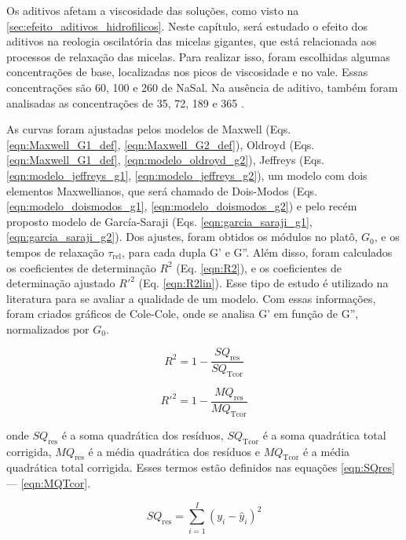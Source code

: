 		Os aditivos afetam a viscosidade das soluções, como visto na \autoref{sec:efeito_aditivos_hidrofilicos}. Neste capítulo, será estudado o efeito dos aditivos na reologia oscilatória das micelas gigantes, que está relacionada aos processos de relaxação das micelas. Para realizar isso, foram escolhidas algumas concentrações de base, localizadas nos picos de viscosidade e no vale. Essas concentrações são 60, 100 e 260\mM{} de NaSal. Na ausência de aditivo, também foram analisadas as concentrações de 35, 72, 189 e 365 \mM.
		
		As curvas foram ajustadas pelos modelos de Maxwell (Eqs. \ref{eqn:Maxwell_G1_def}, \ref{eqn:Maxwell_G2_def}), Oldroyd (Eqs. \ref{eqn:Maxwell_G1_def}, \ref{eqn:modelo_oldroyd_g2}), Jeffreys (Eqs. \ref{eqn:modelo_jeffreys_g1}, \ref{eqn:modelo_jeffreys_g2}), um modelo com dois elementos Maxwellianos, que será chamado de Dois-Modos (Eqs. \ref{eqn:modelo_doismodos_g1}, \ref{eqn:modelo_doismodos_g2}) e pelo recém proposto modelo de García-Saraji (Eqs. \ref{eqn:garcia_saraji_g1}, \ref{eqn:garcia_saraji_g2}). Dos ajustes, foram obtidos os módulos no platô, \(G_0\), e os tempos de relaxação \(\tau_\mathrm{rel}\), para cada dupla G' e G''. Além disso, foram calculados os coeficientes de determinação \(R^2\) (Eq. \ref{eqn:R2}), e os coeficientes de determinação ajustado \(R\mathrm{'}^{2}\) (Eq. \ref{eqn:R2lin}). Esse tipo de estudo é utilizado na literatura para se avaliar a qualidade de um modelo. %
		Com essas informações, foram criados gráficos de Cole-Cole, onde se analisa G' em função de G'', normalizados por \(G_0\).
		
		\begin{equation}
			R^2 = 1 - \dfrac{SQ_\mathrm{res}}{SQ_\mathrm{Tcor}}
			\label{eqn:R2}
		\end{equation}
		
		\begin{equation}
			R\mathrm{'}^{2} = 1 - \dfrac{MQ_\mathrm{res}}{MQ_\mathrm{Tcor}}
			\label{eqn:R2lin}
		\end{equation}
		
		\noindent onde \(SQ_\mathrm{res}\) é a soma quadrática dos resíduos, \(SQ_\mathrm{Tcor}\) é a soma quadrática total corrigida, \(MQ_\mathrm{res}\) é a média quadrática dos resíduos e \(MQ_\mathrm{Tcor}\) é a média quadrática total corrigida. Esses termos estão definidos nas equações \ref{eqn:SQres} --- \ref{eqn:MQTcor}.
		
		\begin{equation}
			SQ_\mathrm{res} = \sum_{i=1}^{I} \left( y_i - \hat{y}_i \right) ^ 2
			\label{eqn:SQres}
		\end{equation}
		
